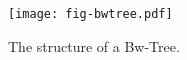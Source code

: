 \begin{figure}[H]
\texttt{[image: fig-bwtree.pdf]}
\caption{ The structure of a Bw-Tree.}
\label{fig:bw-tree}
\end{figure}
